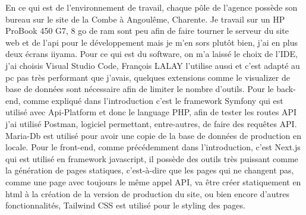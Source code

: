 \documentclass[a4paper,12pt]{report}
\begin{document}
En ce qui est de l'environnement de travail, chaque pôle de l'agence possède son bureau sur le site de la Combe à Angoulême, Charente. Je travail sur un HP ProBook 450 G7, 8 go de ram sont peu afin de faire tourner le serveur du site web et de l'api pour le développement mais je m'en sors plutôt bien, j'ai en plus deux écrans iiyama. Pour ce qui est du software, on m'a laissé le choix de l'IDE, j'ai choisis Visual Studio Code, François LALAY l'utilise aussi et c'est adapté au pc pas très performant que j'avais, quelques extensions comme le visualizer de base de données sont nécessaire afin de limiter le nombre d'outils. Pour le back-end, comme expliqué dans l'introduction c'est le framework Symfony qui est utilisé avec Api-Platform et donc le language PHP, afin de tester les routes API j'ai utilisé Postman, logiciel permettant, entre-autres, de faire des requêtes API. Maria-Db est utilisé pour avoir une copie de la base de données de production en locale. Pour le front-end, comme précédemment dans l'introduction, c'est Next.js qui est utilisé en framework javascript, il possède des outils très puissant comme la génération de pages statiques, c'est-à-dire que les pages qui ne changent pas, comme une page avec toujours le même appel API, va être créer statiquement en html à la création de la version de production du site, ou bien encore d'autres fonctionnalités, Tailwind CSS est utilisé pour le styling des pages.
\end{document}
